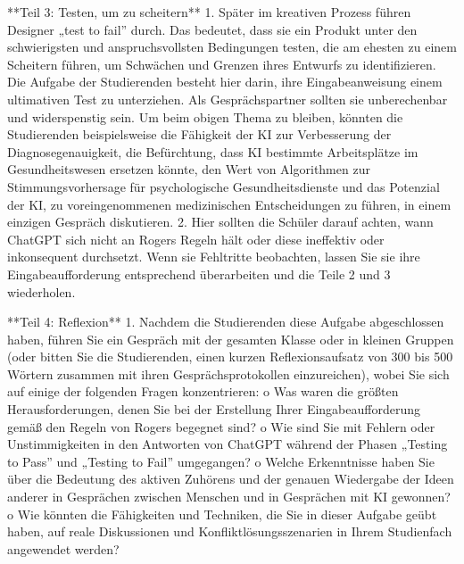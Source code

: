 \documentclass[
  ngerman,
  letterpaper,
  DIV=11]{scrreprt}
\newenvironment{Shaded}{\begin{snugshade}}{\end{snugshade}}
\newcommand{\NormalTok}[1]{\textcolor[rgb]{0.00,0.23,0.31}{#1}}
\newcommand{\SpecialStringTok}[1]{\textcolor[rgb]{0.13,0.47,0.30}{#1}}
\begin{document}
\begin{tcolorbox}
\begin{Shaded}
\begin{Highlighting}[]
\NormalTok{**Teil 3: Testen, um zu scheitern**}
\SpecialStringTok{1.  }\NormalTok{Später im kreativen Prozess führen Designer „test to fail” durch. Das bedeutet, dass sie ein Produkt unter den schwierigsten und anspruchsvollsten Bedingungen testen, die am ehesten zu einem Scheitern führen, um Schwächen und Grenzen ihres Entwurfs zu identifizieren. Die Aufgabe der Studierenden besteht hier darin, ihre Eingabeanweisung einem ultimativen Test zu unterziehen. Als Gesprächspartner sollten sie unberechenbar und widerspenstig sein. Um beim obigen Thema zu bleiben, könnten die Studierenden beispielsweise die Fähigkeit der KI zur Verbesserung der Diagnosegenauigkeit, die Befürchtung, dass KI bestimmte Arbeitsplätze im Gesundheitswesen ersetzen könnte, den Wert von Algorithmen zur Stimmungsvorhersage für psychologische Gesundheitsdienste und das Potenzial der KI, zu voreingenommenen medizinischen Entscheidungen zu führen, in einem einzigen Gespräch diskutieren.}
\SpecialStringTok{2.  }\NormalTok{Hier sollten die Schüler darauf achten, wann ChatGPT sich nicht an Rogers\textquotesingle{} Regeln hält oder diese ineffektiv oder inkonsequent durchsetzt. Wenn sie Fehltritte beobachten, lassen Sie sie ihre Eingabeaufforderung entsprechend überarbeiten und die Teile 2 und 3 wiederholen.}

\NormalTok{**Teil 4: Reflexion**}
\SpecialStringTok{1.  }\NormalTok{Nachdem die Studierenden diese Aufgabe abgeschlossen haben, führen Sie ein Gespräch mit der gesamten Klasse oder in kleinen Gruppen (oder bitten Sie die Studierenden, einen kurzen Reflexionsaufsatz von 300 bis 500 Wörtern zusammen mit ihren Gesprächsprotokollen einzureichen), wobei Sie sich auf einige der folgenden Fragen konzentrieren:}
\NormalTok{o   Was waren die größten Herausforderungen, denen Sie bei der Erstellung Ihrer Eingabeaufforderung gemäß den Regeln von Rogers begegnet sind?}
\NormalTok{o   Wie sind Sie mit Fehlern oder Unstimmigkeiten in den Antworten von ChatGPT während der Phasen „Testing to Pass” und „Testing to Fail” umgegangen?}
\NormalTok{o   Welche Erkenntnisse haben Sie über die Bedeutung des aktiven Zuhörens und der genauen Wiedergabe der Ideen anderer in Gesprächen zwischen Menschen und in Gesprächen mit KI gewonnen?}
\NormalTok{o   Wie könnten die Fähigkeiten und Techniken, die Sie in dieser Aufgabe geübt haben, auf reale Diskussionen und Konfliktlösungsszenarien in Ihrem Studienfach angewendet werden?}

\end{Highlighting}
\end{Shaded}

\end{tcolorbox}
\end{document}
